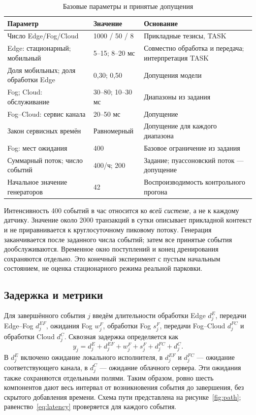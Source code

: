 \documentclass{psta}
\begin{document}
\begin{table}\caption{Базовые параметры и принятые допущения}\label{tab:parameters}\centering\small
\begin{tabular}{|p{32mm}|p{26mm}|p{44mm}|}\hline
Параметр & Значение & Основание\\ \hline
Число Edge/Fog/Cloud & 1000 / 50 / 8 & Прикладные тезисы, TASK\\ \hline
Edge: стационарный; мобильный & 5--15; 8--20 мс & Совместно обработка и передача; интерпретация TASK\\ \hline
Доля мобильных; доля обработки Edge & 0,30; 0,50 & Допущения модели\\ \hline
Fog; Cloud: обслуживание & 30--80; 10--30 мс & Диапазоны из задания\\ \hline
Fog--Cloud: сервис канала & 20--50 мс & Допущение\\ \hline
Закон сервисных времён & Равномерный & Допущение для каждого диапазона\\ \hline
Fog: мест ожидания & 400 & Базовое ограничение из задания\\ \hline
Суммарный поток; число событий & 400/ч; 200 & Задание; пуассоновский поток --- допущение\\ \hline
Начальное значение генераторов & 42 & Воспроизводимость контрольного прогона\\ \hline
\end{tabular}\end{table}

Интенсивность 400 событий в час относится ко \emph{всей системе}, а не к каждому датчику. Значение около 2000 транзакций в сутки описывает прикладной контекст и не приравнивается к круглосуточному пиковому потоку. Генерация заканчивается после заданного числа событий; затем все принятые события дообслуживаются. Временное окно поступлений и конец дренирования сохраняются отдельно. Это конечный эксперимент с пустым начальным состоянием, не оценка стационарного режима реальной парковки.

\subsection{Задержка и метрики}
Для завершённого события $j$ введём длительности обработки Edge $d^E_j$, передачи Edge--Fog $d^{EF}_j$, ожидания Fog $w^F_j$, обработки Fog $s^F_j$, передачи Fog--Cloud $d^{FC}_j$ и обработки Cloud $d^C_j$. Сквозная задержка определяется как
\begin{equation}\label{eq:latency}
y_j=d^E_j+d^{EF}_j+w^F_j+s^F_j+d^{FC}_j+d^C_j.
\end{equation}
В $d^E_j$ включено ожидание локального исполнителя, в $d^{EF}_j$ и $d^{FC}_j$ --- ожидание соответствующего канала, в $d^C_j$ --- ожидание облачного сервера. Эти ожидания также сохраняются отдельными полями. Таким образом, ровно шесть компонентов дают весь интервал от возникновения события до завершения, без скрытого добавления времени. Схема пути представлена на рисунке~\ref{fig:path}; равенство~\eqref{eq:latency} проверяется для каждого события.
\end{document}
